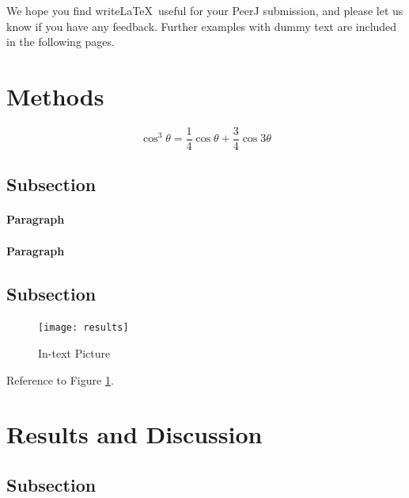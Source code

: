 \documentclass[fleqn,10pt]{wlpeerj} %
\begin{document}
We hope you find write\LaTeX\ useful for your PeerJ submission, and please let us know if you have any feedback. Further examples with dummy text are included in the following pages.

\section*{Methods}

\lipsum[4] %

\begin{equation}
\cos^3 \theta =\frac{1}{4}\cos\theta+\frac{3}{4}\cos 3\theta
\label{eq:refname2}
\end{equation}

\lipsum[5] %

\subsection*{Subsection}

\lipsum[6] %

\paragraph{Paragraph} \lipsum[7] %
\paragraph{Paragraph} \lipsum[8] %

\subsection*{Subsection}

\lipsum[9] %

\begin{figure}[ht]\centering
\texttt{[image: results]}
\caption{In-text Picture}
\label{fig:results}
\end{figure}

Reference to Figure \ref{fig:results}.

\section*{Results and Discussion}

\lipsum[10] %

\subsection*{Subsection}
\end{document}
